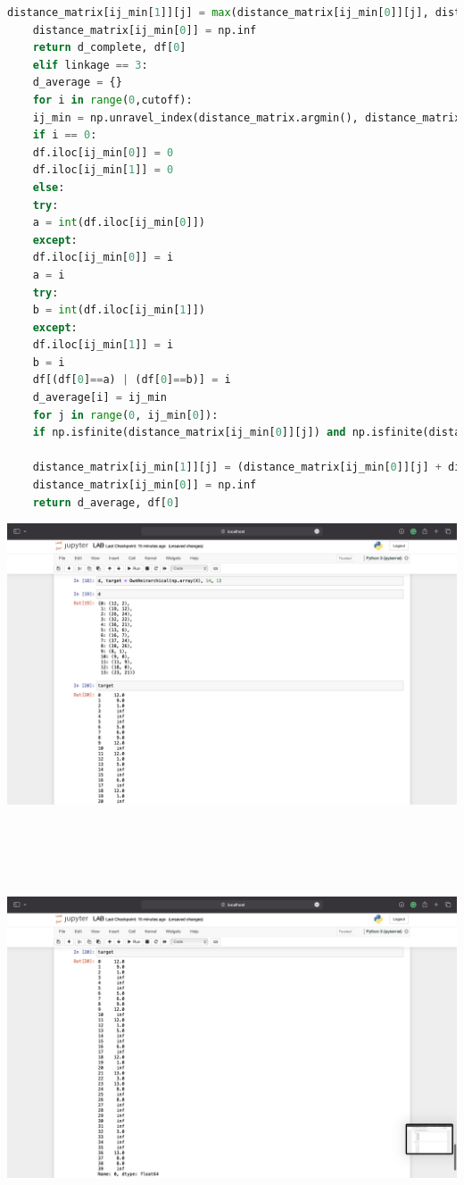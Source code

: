\documentclass{article}
\begin{document}
\begin{lstlisting}[language=Python]
	distance_matrix[ij_min[1]][j] = max(distance_matrix[ij_min[0]][j], distance_matrix[ij_min[1]][j])
	distance_matrix[ij_min[0]] = np.inf
	return d_complete, df[0]
	elif linkage == 3:
	d_average = {}
	for i in range(0,cutoff):
	ij_min = np.unravel_index(distance_matrix.argmin(), distance_matrix.shape)
	if i == 0:
	df.iloc[ij_min[0]] = 0
	df.iloc[ij_min[1]] = 0
	else:
	try:
	a = int(df.iloc[ij_min[0]])
	except:
	df.iloc[ij_min[0]] = i
	a = i
	try:
	b = int(df.iloc[ij_min[1]])
	except:
	df.iloc[ij_min[1]] = i
	b = i
	df[(df[0]==a) | (df[0]==b)] = i
	d_average[i] = ij_min
	for j in range(0, ij_min[0]):
	if np.isfinite(distance_matrix[ij_min[0]][j]) and np.isfinite(distance_matrix[ij_min[1]][j]):
	
	distance_matrix[ij_min[1]][j] = (distance_matrix[ij_min[0]][j] + distance_matrix[ij_min[1]][j])/2.0          
	distance_matrix[ij_min[0]] = np.inf
	return d_average, df[0]
\end{lstlisting}
\includegraphics[scale=0.3]{images/5.png}\\\\\\\\\\\\
\includegraphics[scale=0.3]{images/6.png}
\end{document}
